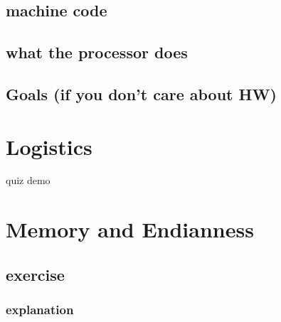 

\subsection{machine code}



\subsection{what the processor does}




\subsection{Goals (if you don't care about HW)}


\section{Logistics}


\begin{frame}{quiz demo}
\end{frame}

\section{Memory and Endianness}



\subsection{exercise}

\subsubsection{explanation}


